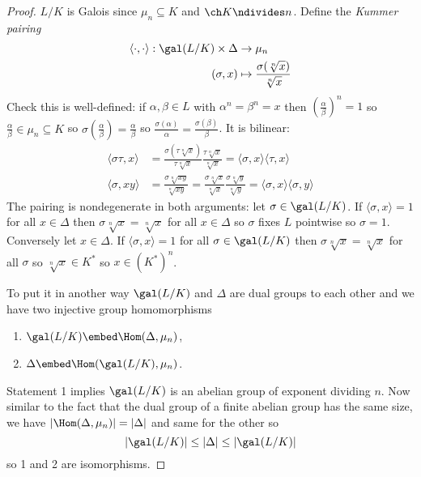 \documentclass[a4paper]{article}
\theoremstyle{definition}
\theoremstyle{theorem}
\begin{document}
\begin{proof}
  \(L/K\) is Galois since \(\mu_n \subseteq K\) and \(\ch K \ndivides n\). Define the \emph{Kummer pairing}
  \begin{align*}
    \langle \cdot , \cdot \rangle: \gal(L/K) \times \Delta &\to \mu_n \\
    (\sigma, x) &\mapsto \frac{\sigma(\sqrt[n]{x})}{\sqrt[n]{x}}
  \end{align*}
  Check this is well-defined: if \(\alpha, \beta \in L\) with \(\alpha^n = \beta^n = x\) then \((\frac{\alpha}{\beta})^n = 1\) so \(\frac{\alpha}{\beta} \in \mu_n \subseteq K\) so \(\sigma(\frac{\alpha}{\beta}) = \frac{\alpha}{\beta}\) so \(\frac{\sigma(\alpha)}{\alpha} = \frac{\sigma(\beta)}{\beta}\). It is bilinear:
  \begin{align*}
    \langle \sigma\tau, x \rangle
    &= \frac{\sigma(\tau \sqrt[n]{x})}{\tau \sqrt[n]x} \frac{\tau \sqrt[n]x}{\sqrt[n]x}
      = \langle \sigma, x \rangle \langle \tau, x \rangle \\
    \langle \sigma, xy \rangle
    &= \frac{\sigma \sqrt[n]{xy}}{\sqrt[n]{xy}}
      = \frac{\sigma \sqrt[n]x}{\sqrt[n]x} \frac{\sigma \sqrt[n]y}{\sqrt[n]y}
      = \langle \sigma, x\rangle \langle \sigma, y\rangle
  \end{align*}
  The pairing is nondegenerate in both arguments: let \(\sigma \in \gal(L/K)\). If \(\langle \sigma, x\rangle = 1\) for all \(x \in \Delta\) then \(\sigma \sqrt[n]x = \sqrt[n]x\) for all \(x \in \Delta\) so \(\sigma\) fixes \(L\) pointwise so \(\sigma = 1\). Conversely let \(x \in \Delta\). If \(\langle \sigma, x \rangle = 1\) for all \(\sigma \in \gal(L/K)\) then \(\sigma \sqrt[n]x = \sqrt[n]x\) for all \(\sigma\) so \(\sqrt[n]x \in K^*\) so \(x \in (K^*)^n\).

  To put it in another way \(\gal(L/K)\) and \(\Delta\) are dual groups to each other and we have two injective group homomorphisms
  \begin{enumerate}
  \item \(\gal(L/K) \embed \Hom(\Delta, \mu_n)\),
  \item \(\Delta \embed \Hom(\gal(L/K), \mu_n)\).
  \end{enumerate}
  Statement 1 implies \(\gal(L/K)\) is an abelian group of exponent dividing \(n\). Now similar to the fact that the dual group of a finite abelian group has the same size, we have \(|\Hom(\Delta, \mu_n)| = |\Delta|\) and same for the other so
  \[
    |\gal(L/K)| \leq |\Delta| \leq |\gal(L/K)|
  \]
  so 1 and 2 are isomorphisms.
\end{proof}
\end{document}
